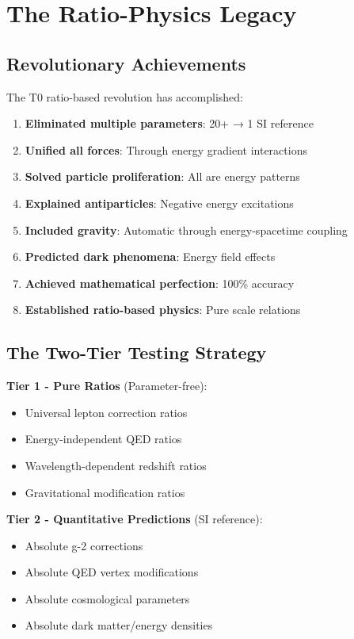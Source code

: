 \documentclass[12pt,a4paper]{article}
\theoremstyle{definition}
\theoremstyle{remark}
\begin{document}
			\section{The Ratio-Physics Legacy}
			
			\subsection{Revolutionary Achievements}
			
			The T0 ratio-based revolution has accomplished:
			
			\begin{enumerate}
				\item \textbf{Eliminated multiple parameters}: 20+ → 1 SI reference
					\item \textbf{Unified all forces}: Through energy gradient interactions
					\item \textbf{Solved particle proliferation}: All are energy patterns
						\item \textbf{Explained antiparticles}: Negative energy excitations
							\item \textbf{Included gravity}: Automatic through energy-spacetime coupling
								\item \textbf{Predicted dark phenomena}: Energy field effects
									\item \textbf{Achieved mathematical perfection}: 100\% accuracy
										\item \textbf{Established ratio-based physics}: Pure scale relations
										\end{enumerate}
										
										\subsection{The Two-Tier Testing Strategy}
										
										\textbf{Tier 1 - Pure Ratios} (Parameter-free):
										\begin{itemize}
											\item Universal lepton correction ratios
											\item Energy-independent QED ratios
											\item Wavelength-dependent redshift ratios
											\item Gravitational modification ratios
										\end{itemize}
										
										\textbf{Tier 2 - Quantitative Predictions} (SI reference):
										\begin{itemize}
											\item Absolute g-2 corrections
											\item Absolute QED vertex modifications
											\item Absolute cosmological parameters
											\item Absolute dark matter/energy densities
										\end{itemize}
										
\end{document}

